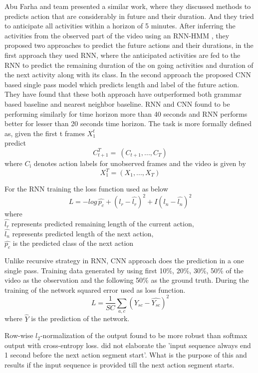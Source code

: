 \newpara
Abu Farha and team presented \cite{abu2018will} a similar work, where they discussed methods to predicts action that are considerably in future and their duration. And they tried to anticipate all activities within a horizon of 5 minutes. After inferring the activities from the observed part of the video using an RNN-HMM \cite{richard2017weakly}, they proposed two approaches to predict the future actions and their durations, in the first approach they used RNN, where the anticipated activities are fed to the RNN to predict the remaining duration of the on going activities and duration of the next activity along with its class.
In the second approach the proposed CNN based single pass model which predicts length and label of the future action. They have found that these both approach have outperformed both grammar based baseline and nearest neighbor baseline. RNN and CNN found to be performing similarly for time horizon more than 40 seconds and RNN performs better for lesser than 20 seconds time horizon. The task is more formally defined as,
given the first t frames $X_{\text{1}}^t$ \\
predict \[ C_{t+1}^T  = \ (C_{t+1}, ..., C_{T}) \]
where $C_{\text{i}}$ denotes action labels for unobserved frames
and the video is given by
\[ X_{1}^T = (X_{1}, ..., X_{T}) \]

\newpara
For the RNN training the loss function used as below
\begin{equation}
    L = -log\, \hat{p_c} + (l_r - \hat{l_r})^2 +  I (l_n - \hat{l_n})^2 
\end{equation}
where \\
$\hat{l_r}$ represents predicted remaining length of the current action, \\
$\hat{l_n}$ represents predicted length of the next action, \\
$\hat{p_c}$ is the predicted class of the next action

Unlike recursive strategy in RNN, CNN approach does the prediction in a one single pass.
Training data generated by using first 10\%, 20\%, 30\%, 50\% of the video as the observation and the following 50\% as the ground truth. During the training of the network squared error used as loss function.
\begin{equation}
    L = \frac{1} {SC} \sum_{a,c} (Y_{sc} - \hat{Y_{sc}})^2 
\end{equation}
where $\hat{Y}$ is the prediction of the network.

Row-wise $\textit{l}_2$-normalization of the output found to be more robust than softmax output with cross-entropy loss. \cite{abu2018will} did not elaborate the 'input sequence always end 1 second before the next action segment start'. What is the purpose of this and results if the input sequence is provided till the next action segment starts.

